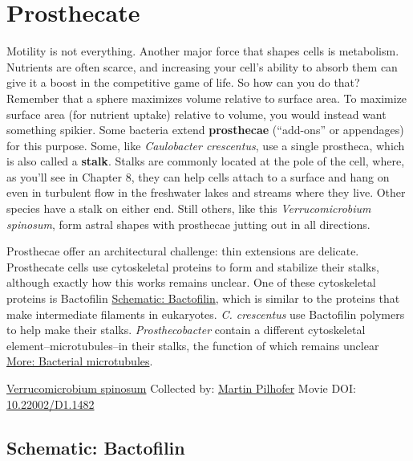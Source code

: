 \documentclass[]{tufte-book}
\begin{document}
\hypertarget{prosthecate}{%
\section{Prosthecate}\label{prosthecate}}

Motility is not everything. Another major force that shapes cells is metabolism. Nutrients are often scarce, and increasing your cell's ability to absorb them can give it a boost in the competitive game of life. So how can you do that? Remember that a sphere maximizes volume relative to surface area. To maximize surface area (for nutrient uptake) relative to volume, you would instead want something spikier. Some bacteria extend \textbf{prosthecae} (``add-ons'' or appendages) for this purpose. Some, like \emph{Caulobacter crescentus}, use a single prostheca, which is also called a \textbf{stalk}. Stalks are commonly located at the pole of the cell, where, as you'll see in Chapter 8, they can help cells attach to a surface and hang on even in turbulent flow in the freshwater lakes and streams where they live. Other species have a stalk on either end. Still others, like this \emph{Verrucomicrobium spinosum}, form astral shapes with prosthecae jutting out in all directions.

Prosthecae offer an architectural challenge: thin extensions are delicate. Prosthecate cells use cytoskeletal proteins to form and stabilize their stalks, although exactly how this works remains unclear. One of these cytoskeletal proteins is Bactofilin \protect\hyperlink{Bactofilin}{Schematic: Bactofilin}, which is similar to the proteins that make intermediate filaments in eukaryotes. \emph{C. crescentus} use Bactofilin polymers to help make their stalks. \emph{Prosthecobacter} contain a different cytoskeletal element--microtubules--in their stalks, the function of which remains unclear \protect\hyperlink{Bacterial_microtubules}{More: Bacterial microtubules}.



\hypertarget{htmlwidget-897813a965b25b198369}{}

\label{fig:3-6}\protect\hyperlink{tree}{Verrucomicrobium spinosum} Collected by: \protect\hyperlink{martin_pilhofer}{Martin Pilhofer} Movie DOI: \href{https://doi.org/10.22002/D1.1482}{10.22002/D1.1482}

\hypertarget{Bactofilin}{%
\subsection*{Schematic: Bactofilin}\label{Bactofilin}}
\end{document}
